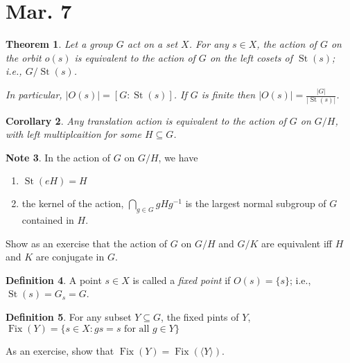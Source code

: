 \documentclass{amsart}
\newtheorem{thm}{Theorem}[section]
\newtheorem{cor}[thm]{Corollary}
\theoremstyle{definition}
\newtheorem{definition}[thm]{Definition}
\newtheorem{note}[thm]{Note}
\DeclareMathOperator{\St}{St}
\DeclareMathOperator{\Fix}{Fix}
\begin{document}
\section{Mar. 7}
\begin{thm}
	Let a group $G$ act on a set $X$. For any $s\in X$, the action of $G$ on the orbit $o(s)$ is equivalent to the action of $G$ on the left cosets of $\St(s)$; i.e., $G/\St(s)$.
	
	In particular, $|O(s)|=[G:\St(s)]$. If $G$ is finite then $|O(s)|=\frac{|G|}{|\St(s)|}$.
\end{thm}
\begin{cor}
	Any translation action is equivalent to the action of $G$ on $G/H$, with left multiplcaition for some $H\subseteq G$.
\end{cor}
\begin{note}
	In the action of $G$ on $G/H$, we have
	\begin{enumerate}
		\item $\St(eH)=H$
		\item the kernel of the action, $\bigcap\limits_{g\in G}gHg^{-1}$ is the largest normal subgroup of $G$ contained in $H$.
	\end{enumerate}
\end{note}
Show as an exercise that the action of $G$ on $G/H$ and $G/K$ are equivalent iff $H$ and $K$ are conjugate in $G$.
\begin{definition}
	A point $s\in X$ is called a \emph{fixed point} if $O(s)=\{s\}$; i.e., $\St(s)=G_s=G$.
\end{definition}
\begin{definition}
	For any subset $Y\subseteq G$, the fixed pints of $Y$, $\Fix(Y)=\{s\in X:gs=s\text{ for all }g\in Y\}$
\end{definition}
As an exercise, show that $\Fix(Y)=\Fix(\langle Y\rangle)$.
\end{document}
